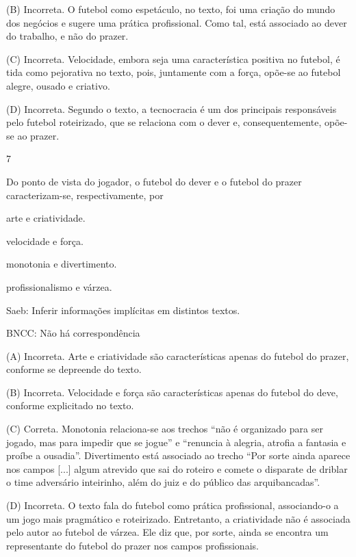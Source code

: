 (B) Incorreta. O futebol como espetáculo, no texto, foi uma criação do
mundo dos negócios e sugere uma prática profissional. Como tal, está
associado ao dever do trabalho, e não do prazer.

(C) Incorreta. Velocidade, embora seja uma característica positiva no
futebol, é tida como pejorativa no texto, pois, juntamente com a força,
opõe-se ao futebol alegre, ousado e criativo.

(D) Incorreta. Segundo o texto, a tecnocracia é um dos principais
responsáveis pelo futebol roteirizado, que se relaciona com o dever e,
consequentemente, opõe-se ao prazer.

\num{7}

Do ponto de vista do jogador, o futebol do dever e o futebol do prazer
caracterizam-se, respectivamente, por

\begin{escolha}
\item arte e criatividade.

\item velocidade e força.

\item monotonia e divertimento.

\item profissionalismo e várzea.
\end{escolha}

Saeb: Inferir informações implícitas em distintos textos.

BNCC: Não há correspondência

(A) Incorreta. Arte e criatividade são características apenas do futebol
do prazer, conforme se depreende do texto.

(B) Incorreta. Velocidade e força são características apenas do futebol
do deve, conforme explicitado no texto.

(C) Correta. Monotonia relaciona-se aos trechos ``não é organizado para
ser jogado, mas para impedir que se jogue'' e ``renuncia à alegria,
atrofia a fantasia e proíbe a ousadia''. Divertimento está associado ao
trecho ``Por sorte ainda aparece nos campos {[}...{]} algum atrevido que
sai do roteiro e comete o disparate de driblar o time adversário
inteirinho, além do juiz e do público das arquibancadas''.

(D) Incorreta. O texto fala do futebol como prática profissional,
associando-o a um jogo mais pragmático e roteirizado. Entretanto, a
criatividade não é associada pelo autor ao futebol de várzea. Ele diz
que, por sorte, ainda se encontra um representante do futebol do prazer
nos campos profissionais.

